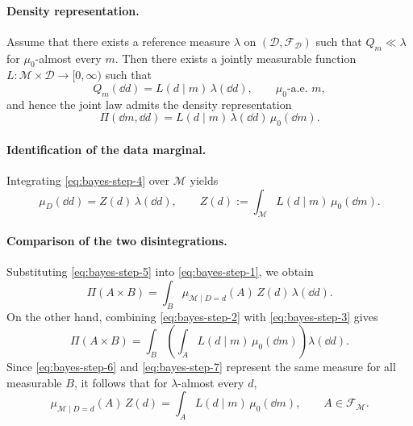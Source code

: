 \documentclass[11pt]{article}
\theoremstyle{remark}
\newcommand{\modelspace}{\mathcal{M}}
\newcommand{\dataspace}{\mathcal{D}}
\begin{document}
\paragraph{Density representation.}
Assume that there exists a reference measure \(\lambda\) on
\((\dataspace,\mathcal F_{\dataspace})\) such that
\(Q_m\ll\lambda\) for \(\mu_0\)-almost every \(m\).
Then there exists a jointly measurable function
\(L:\modelspace\times\dataspace\to[0,\infty)\) such that
\begin{equation}\label{eq:bayes-step-3}
  Q_m(\dd d)
  =
  L(d\mid m)\,\lambda(\dd d),
  \qquad
  \mu_0\text{-a.e. }m,
\end{equation}
and hence the joint law admits the density representation
\begin{equation}\label{eq:bayes-step-4}
  \Pi(\dd m,\dd d)
  =
  L(d\mid m)\,\lambda(\dd d)\,\mu_0(\dd m).
\end{equation}

\paragraph{Identification of the data marginal.}
Integrating \eqref{eq:bayes-step-4} over \(\modelspace\) yields
\begin{equation}\label{eq:bayes-step-5}
  \mu_D(\dd d)
  =
  Z(d)\,\lambda(\dd d),
  \qquad
  Z(d)
  :=
  \int_{\modelspace} L(d\mid m)\,\mu_0(\dd m).
\end{equation}

\paragraph{Comparison of the two disintegrations.}
Substituting \eqref{eq:bayes-step-5} into \eqref{eq:bayes-step-1}, we obtain
\begin{equation}\label{eq:bayes-step-6}
  \Pi(A\times B)
  =
  \int_B
  \mu_{\modelspace\mid D=d}(A)\,Z(d)\,\lambda(\dd d).
\end{equation}
On the other hand, combining \eqref{eq:bayes-step-2} with
\eqref{eq:bayes-step-3} gives
\begin{equation}\label{eq:bayes-step-7}
  \Pi(A\times B)
  =
  \int_B
  \left(
    \int_A L(d\mid m)\,\mu_0(\dd m)
  \right)
  \lambda(\dd d).
\end{equation}
Since \eqref{eq:bayes-step-6} and \eqref{eq:bayes-step-7} represent the same
measure for all measurable \(B\), it follows that for
\(\lambda\)-almost every \(d\),
\begin{equation}\label{eq:bayes-step-8}
  \mu_{\modelspace\mid D=d}(A)\,Z(d)
  =
  \int_A L(d\mid m)\,\mu_0(\dd m),
  \qquad
  A\in\mathcal F_{\modelspace}.
\end{equation}
\end{document}
